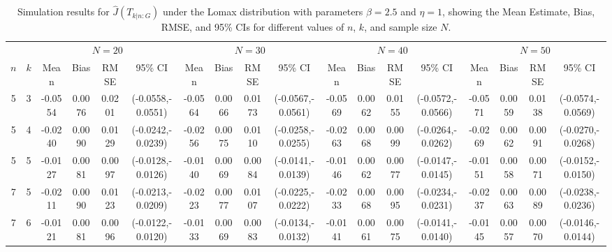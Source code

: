 \documentclass[12pt,a4paper]{article}
\numberwithin{equation}{section}
\begin{document}
\begin{table}
\centering
\caption{Simulation results for $\widehat J(T_{k|n:G})$ under the Lomax distribution with parameters $\beta=2.5$ and $\eta=1$, showing the Mean Estimate, Bias, RMSE, and 95\% CIs for different values of $n$, $k$, and sample size $N$.}
\label{tab1}

\renewcommand{\arraystretch}{1.5}
\setlength{\tabcolsep}{3pt}

\scriptsize

\begin{tabular}{cccccccccccccccccc}
\toprule

& &
\multicolumn{4}{c}{$N=20$} &
\multicolumn{4}{c}{$N=30$} &
\multicolumn{4}{c}{$N=40$} &
\multicolumn{4}{c}{$N=50$} \\

\cmidrule(lr){3-6}
\cmidrule(lr){7-10}
\cmidrule(lr){11-14}
\cmidrule(lr){15-18}

$n$ & $k$
& Mean & Bias & RMSE & 95\% CI
& Mean & Bias & RMSE & 95\% CI
& Mean & Bias & RMSE & 95\% CI
& Mean & Bias & RMSE & 95\% CI \\

\midrule

5 & 3
& -0.0554 & 0.0076 & 0.0201 & (-0.0558,-0.0551)
& -0.0564 & 0.0066 & 0.0173 & (-0.0567,-0.0561)
& -0.0569 & 0.0062 & 0.0155 & (-0.0572,-0.0566)
& -0.0571 & 0.0059 & 0.0138 & (-0.0574,-0.0569) \\

5 & 4
& -0.0240 & 0.0090 & 0.0129 & (-0.0242,-0.0239)
& -0.0256 & 0.0075 & 0.0110 & (-0.0258,-0.0255)
& -0.0263 & 0.0068 & 0.0099 & (-0.0264,-0.0262)
& -0.0269 & 0.0062 & 0.0091 & (-0.0270,-0.0268) \\

5 & 5
& -0.0127 & 0.0081 & 0.0097 & (-0.0128,-0.0126)
& -0.0140 & 0.0069 & 0.0084 & (-0.0141,-0.0139)
& -0.0146 & 0.0062 & 0.0077 & (-0.0147,-0.0145)
& -0.0151 & 0.0058 & 0.0071 & (-0.0152,-0.0150) \\

\midrule

7 & 5
& -0.0211 & 0.0090 & 0.0123 & (-0.0213,-0.0209)
& -0.0223 & 0.0077 & 0.0107 & (-0.0225,-0.0222)
& -0.0233 & 0.0068 & 0.0095 & (-0.0234,-0.0231)
& -0.0237 & 0.0063 & 0.0089 & (-0.0238,-0.0236) \\

7 & 6
& -0.0121 & 0.0081 & 0.0096 & (-0.0122,-0.0120)
& -0.0133 & 0.0069 & 0.0083 & (-0.0134,-0.0132)
& -0.0141 & 0.0061 & 0.0075 & (-0.0141,-0.0140)
& -0.0145 & 0.0057 & 0.0070 & (-0.0146,-0.0144) \\


\end{tabular}
\end{table}
\end{document}
